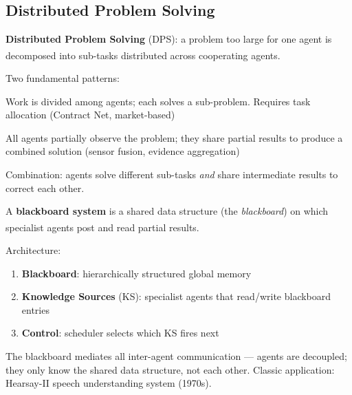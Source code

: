 \subsection{Distributed Problem Solving}
\begin{tcbitemize}[ skin=sectionraster ]

    \tcbitem[title=Task Decomposition and Sharing, raster multicolumn=3]
    \textbf{Distributed Problem Solving} (DPS): a problem too large for one
    agent is decomposed into sub-tasks distributed across cooperating agents.
    \textsuperscript{\cite[][p.~154]{weissMultiagentSystems2013}}

    Two fundamental patterns:
    \begin{description}[leftmargin=0.6cm, labelindent=0pt]
        \item[\textbf{Task sharing}] Work is divided among agents; each solves a sub-problem.
              Requires task allocation (Contract Net, market-based)
        \item[\textbf{Result sharing}] All agents partially observe the problem; they share
              partial results to produce a combined solution (sensor fusion, evidence aggregation)
    \end{description}
    Combination: agents solve different sub-tasks \emph{and} share intermediate
    results to correct each other.

    \tcbitem[title=Blackboard Systems, raster multicolumn=3]
    A \textbf{blackboard system} is a shared data structure (the
    \emph{blackboard}) on which specialist agents post and read partial
    results.\textsuperscript{\cite[][p.~157]{weissMultiagentSystems2013}}

    Architecture:
    \begin{enumerate}
        \item \textbf{Blackboard}: hierarchically structured global memory
        \item \textbf{Knowledge Sources} (KS): specialist agents that read/write blackboard entries
        \item \textbf{Control}: scheduler selects which KS fires next
    \end{enumerate}
    The blackboard mediates all inter-agent communication --- agents are
    decoupled; they only know the shared data structure, not each other.
    Classic application: Hearsay-II speech understanding system (1970s).

\end{tcbitemize}

